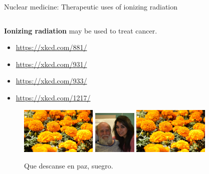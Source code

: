 \documentclass{beamer}
\begin{document}
\begin{frame}{Nuclear medicine: Therapeutic uses of ionizing radiation}
\begin{columns}[T]
\begin{column}{0.5\textwidth}
\footnotesize
\textbf{\alert{Ionizing radiation}} may be used to treat cancer.
\begin{itemize}
\item \url{https://xkcd.com/881/}
\item \url{https://xkcd.com/931/}
\item \url{https://xkcd.com/933/}
\item \url{https://xkcd.com/1217/}
\end{itemize}
\begin{figure}
\centering
\includegraphics[width=0.35\textwidth,trim=0cm 0cm 12cm 0cm,clip=true]{figures/flores.jpg}
\includegraphics[width=0.2\textwidth,trim=0cm 0cm 27cm 11cm,clip=true]{figures/alfredo.jpg}
\includegraphics[width=0.35\textwidth,trim=0cm 0cm 12cm 0cm,clip=true]{figures/flores.jpg}
\caption{\label{fig:suegro} Que descanse en paz, suegro.}
\end{figure}
\end{column}
\begin{column}{0.5\textwidth}
\footnotesize
\begin{figure}
\centering

\end{figure}
\end{column}
\end{columns}
\end{frame}
\end{document}

